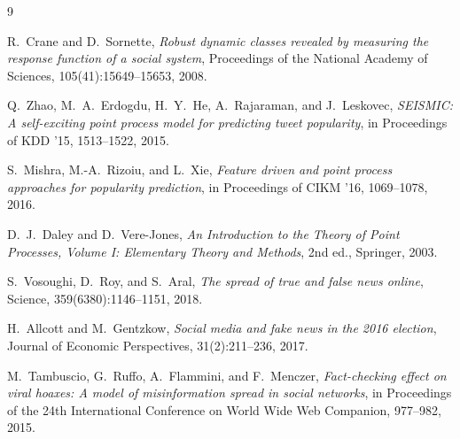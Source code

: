 \documentclass[11pt]{article}
\begin{document}
\begin{thebibliography}{9}

R.~Crane and D.~Sornette,
\textit{Robust dynamic classes revealed by measuring the response function of a social system},
Proceedings of the National Academy of Sciences, 105(41):15649--15653, 2008.

Q.~Zhao, M.~A.~Erdogdu, H.~Y.~He, A.~Rajaraman, and J.~Leskovec,
\textit{SEISMIC: A self-exciting point process model for predicting tweet popularity},
in Proceedings of KDD '15, 1513--1522, 2015.

S.~Mishra, M.-A.~Rizoiu, and L.~Xie,
\textit{Feature driven and point process approaches for popularity prediction},
in Proceedings of CIKM '16, 1069--1078, 2016.

D.~J.~Daley and D.~Vere-Jones,
\textit{An Introduction to the Theory of Point Processes, Volume I: Elementary Theory and Methods},
2nd ed., Springer, 2003.

S.~Vosoughi, D.~Roy, and S.~Aral,
\textit{The spread of true and false news online},
Science, 359(6380):1146--1151, 2018.

H.~Allcott and M.~Gentzkow,
\textit{Social media and fake news in the 2016 election},
Journal of Economic Perspectives, 31(2):211--236, 2017.

M.~Tambuscio, G.~Ruffo, A.~Flammini, and F.~Menczer,
\textit{Fact-checking effect on viral hoaxes: A model of misinformation spread in social networks},
in Proceedings of the 24th International Conference on World Wide Web Companion, 977--982, 2015.

\end{thebibliography}
\end{document}

